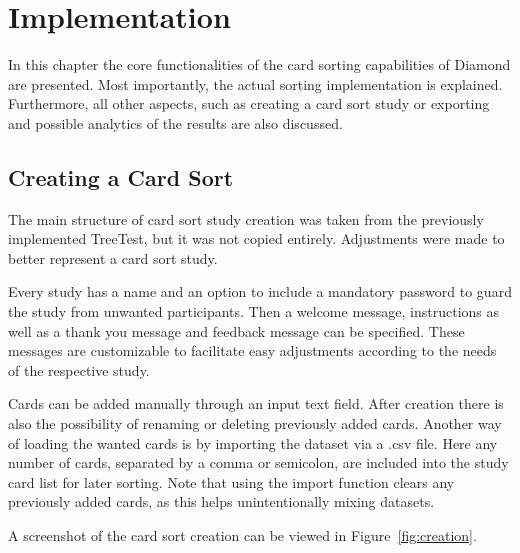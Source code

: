 \chapter{Implementation}

\label{chap:Implem}


In this chapter the core functionalities of the card sorting capabilities of
Diamond are presented. Most importantly, the actual sorting implementation is 
explained. Furthermore, all other aspects, such as creating a card sort study
or exporting and possible analytics of the results are also discussed.


\section{Creating a Card Sort}

The main structure of card sort study creation was taken from the previously 
implemented TreeTest, but it was not copied entirely. Adjustments were made to
better represent a card sort study. 

Every study has a name and an option to include a mandatory password to guard
the study from unwanted participants. Then a welcome message, instructions as
well as a thank you message and feedback message can be specified. These
messages are customizable to facilitate easy adjustments according to the needs
of the respective study.

Cards can be added manually through an input text field. After creation there is
also the possibility of renaming or deleting previously added cards. Another way
of loading the wanted cards is by importing the dataset via a .csv file. Here 
any number of cards, separated by a comma or semicolon, are included into the
study card list for later sorting. Note that using the import function clears
any previously added cards, as this helps unintentionally mixing datasets.

A screenshot of the card sort creation can be viewed in
Figure~\ref{fig:creation}. 


